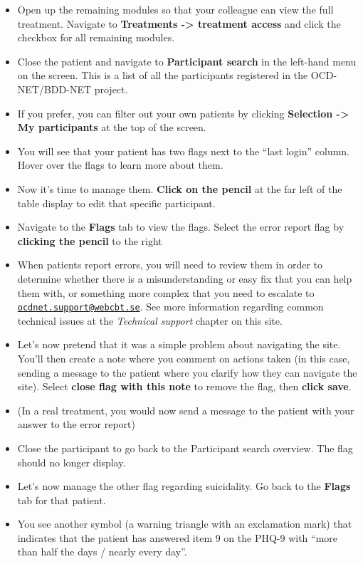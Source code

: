 \documentclass[]{book}
\providecommand{\tightlist}{%
  \setlength{\itemsep}{0pt}\setlength{\parskip}{0pt}}
\begin{document}
\begin{itemize}
\tightlist
\item
  Open up the remaining modules so that your colleague can view the full treatment. Navigate to \textbf{Treatments -\textgreater{} treatment access} and click the checkbox for all remaining modules.
\item
  Close the patient and navigate to \textbf{Participant search} in the left-hand menu on the screen. This is a list of all the participants registered in the OCD-NET/BDD-NET project.
\item
  If you prefer, you can filter out your own patients by clicking \textbf{Selection -\textgreater{} My participants} at the top of the screen.
\item
  You will see that your patient has two flags next to the ``last login'' column. Hover over the flags to learn more about them.
\item
  Now it's time to manage them. \textbf{Click on the pencil} at the far left of the table display to edit that specific participant.
\item
  Navigate to the \textbf{Flags} tab to view the flags. Select the error report flag by \textbf{clicking the pencil} to the right
\item
  When patients report errors, you will need to review them in order to determine whether there is a misunderstanding or easy fix that you can help them with, or something more complex that you need to escalate to \href{mailto:ocdnet.support@webcbt.se}{\nolinkurl{ocdnet.support@webcbt.se}}. See more information regarding common technical issues at the \emph{Technical support} chapter on this site.
\item
  Let's now pretend that it was a simple problem about navigating the site. You'll then create a note where you comment on actions taken (in this case, sending a message to the patient where you clarify how they can navigate the site). Select \textbf{close flag with this note} to remove the flag, then \textbf{click save}.
\item
  (In a real treatment, you would now send a message to the patient with your answer to the error report)
\item
  Close the participant to go back to the Participant search overview. The flag should no longer display.
\item
  Let's now manage the other flag regarding suicidality. Go back to the \textbf{Flags} tab for that patient.
\item
  You see another symbol (a warning triangle with an exclamation mark) that indicates that the patient has answered item 9 on the PHQ-9 with ``more than half the days / nearly every day''.

\end{itemize}
\end{document}

